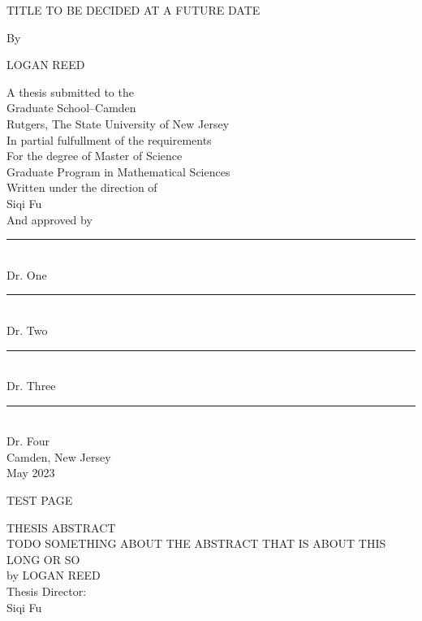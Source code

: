 \documentclass[12pt]{report}
\numberwithin{definition}{section}
\begin{document}
  \doublespacing
  
\begin{titlepage}

   \begin{center}
      

      TITLE TO BE DECIDED AT A FUTURE DATE

            
     
       By
              


      LOGAN REED

     
            
        A thesis submitted to the \\
       Graduate School–Camden\\
       Rutgers, The State University of New Jersey\\
       In partial fulfullment of the requirements\\
       For the degree of Master of Science\\
       Graduate Program in Mathematical Sciences \\
       Written under the direction of \\
       Siqi Fu\\
       And approved by \\
       \noindent\rule{4cm}{0.4pt}\\
       Dr. One\\
      \noindent\rule{4cm}{0.4pt}\\
       Dr. Two\\
           \noindent\rule{4cm}{0.4pt}\\
       Dr. Three\\
                \noindent\rule{4cm}{0.4pt}\\
       Dr. Four\\
         \vspace{0.8cm}
       Camden, New Jersey\\
       May 2023
            
       \vspace{0.8cm}
     
  
        
            
   \end{center}
   
\end{titlepage}




\break
TEST PAGE

  \begin{center}

\break
  THESIS ABSTRACT\\
 
    TODO SOMETHING ABOUT THE ABSTRACT THAT IS ABOUT THIS LONG OR SO \\
         by LOGAN REED\\
     
     Thesis Director: \\
     Siqi Fu
  \end {center}
\end{document}
